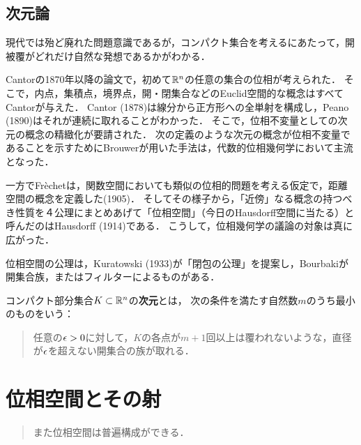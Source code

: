 \documentclass[uplatex,dvipdfmx]{jsreport}
\begin{document}
\section{次元論}

\begin{tcolorbox}[colframe=ForestGreen, colback=ForestGreen!10!white,breakable,colbacktitle=ForestGreen!40!white,coltitle=black,fonttitle=\bfseries\sffamily,
title=]
    現代では殆ど廃れた問題意識であるが，コンパクト集合を考えるにあたって，開被覆がどれだけ自然な発想であるかがわかる．
\end{tcolorbox}

\begin{history}
    Cantorの1870年以降の論文で，初めて$\mathbb{R}^n$の任意の集合の位相が考えられた．
    そこで，内点，集積点，境界点，開・閉集合などのEuclid空間的な概念はすべてCantorが与えた．
    Cantor (1878)は線分から正方形への全単射を構成し，Peano (1890)はそれが連続に取れることがわかった．
    そこで，位相不変量としての次元の概念の精緻化が要請された．
    次の定義のような次元の概念が位相不変量であることを示すためにBrouwerが用いた手法は，代数的位相幾何学において主流となった．

    一方でFr\`{e}chetは，関数空間においても類似の位相的問題を考える仮定で，距離空間の概念を定義した(1905)．
    そしてその様子から，「近傍」なる概念の持つべき性質を４公理にまとめあげて「位相空間」（今日のHausdorff空間に当たる）と呼んだのはHausdorff (1914)である．
    こうして，位相幾何学の議論の対象は真に広がった．

    位相空間の公理は，Kuratowski (1933)が「閉包の公理」を提案し，Bourbakiが開集合族，またはフィルターによるものがある．
    
\end{history}

\begin{definition}
    コンパクト部分集合$K\subset\mathbb{R}^n$の\textbf{次元}とは，
    次の条件を満たす自然数$m$のうち最小のものをいう：
    \begin{quote}
        任意の$\epsilon>0$に対して，$K$の各点が$m+1$回以上は覆われないような，直径が$\epsilon$を超えない開集合の族が取れる．
    \end{quote}
\end{definition}

\chapter{位相空間とその射}

\begin{quotation}
    また位相空間は普遍構成ができる．
\end{quotation}
\end{document}
